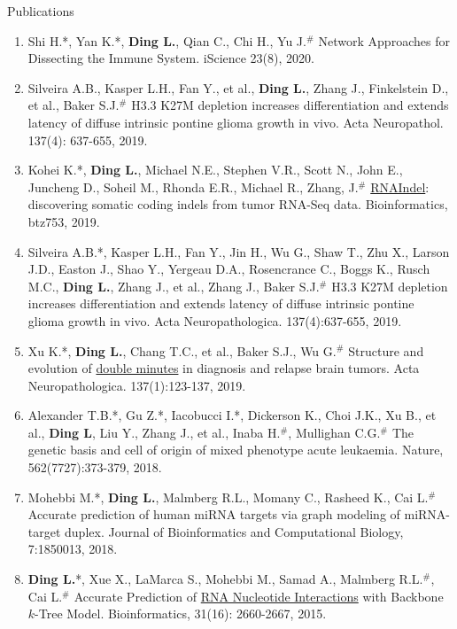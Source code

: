 \documentclass{resume} %
\begin{document}
\begin{rSection}{Publications}
\begin{enumerate}
\item Shi H.*, Yan K.*, \textbf{Ding L.}, Qian C., Chi H., Yu J.$^{\#}$ Network Approaches for Dissecting the Immune System. iScience 23(8), 2020.

\item Silveira A.B., Kasper L.H., Fan Y., et al., \textbf{Ding L.}, Zhang J., Finkelstein D., et al., Baker S.J.$^{\#}$ H3.3 K27M depletion increases differentiation and extends latency of diffuse intrinsic pontine glioma growth in vivo. Acta Neuropathol. 137(4): 637-655, 2019.

\item Kohei K.*, \textbf{Ding L.}, Michael N.E., Stephen V.R., Scott N., John E., Juncheng D., Soheil M., Rhonda E.R., Michael R., Zhang, J.$^{\#}$ \href{https://academic.oup.com/bioinformatics/article/36/5/1382/5583731}{RNAIndel}: discovering somatic coding indels from tumor RNA-Seq data. Bioinformatics, btz753, 2019.

\item Silveira A.B.*, Kasper L.H., Fan Y., Jin H., Wu G., Shaw T., Zhu X., Larson J.D., Easton J., Shao Y., Yergeau D.A., Rosencrance C., Boggs K., Rusch M.C., \textbf{Ding L.}, Zhang J., et al., Zhang J., Baker S.J.$^{\#}$ H3.3 K27M depletion increases differentiation and extends latency of diffuse intrinsic pontine glioma growth in vivo. Acta Neuropathologica. 137(4):637-655, 2019.

\item Xu K.*, \textbf{Ding L.}, Chang T.C., et al., Baker S.J., Wu G.$^{\#}$ Structure and evolution of \href{https://link.springer.com/article/10.1007/s00401-018-1912-1}{double minutes} in diagnosis and relapse brain tumors. Acta Neuropathologica. 137(1):123-137, 2019.

\item Alexander T.B.*, Gu Z.*, Iacobucci I.*, Dickerson K., Choi J.K., Xu B., et al., \textbf{Ding L}, Liu Y., Zhang J., et al., Inaba H.$^{\#}$, Mullighan C.G.$^{\#}$ The genetic basis and cell of origin of mixed phenotype acute leukaemia. Nature, 562(7727):373-379, 2018.

\item Mohebbi M.*, \textbf{Ding L.}, Malmberg R.L., Momany C., Rasheed K., Cai L.$^{\#}$ Accurate prediction of human miRNA targets via graph modeling of miRNA-target duplex. Journal of Bioinformatics and Computational Biology, 7:1850013, 2018.

\item \textbf{Ding L.}*, Xue X., LaMarca S., Mohebbi M., Samad A., Malmberg R.L.$^{\#}$, Cai L.$^{\#}$ Accurate Prediction of \href{https://academic.oup.com/bioinformatics/article/31/16/2660/321332}{RNA Nucleotide Interactions} with Backbone $k$-Tree Model. Bioinformatics, 31(16): 2660-2667, 2015.
\end{enumerate}



\end{rSection}
\end{document}
